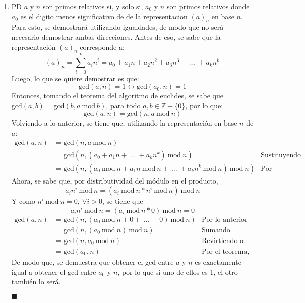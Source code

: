 \documentclass[letter]{article}
\begin{document}
\begin{pregunta}{1}
\begin{enumerate}
		\item \underline{PD} $a$ y $n$ son primos relativos si, y solo si, $a_0$ y $n$ son primos relativos donde $a_0$ es el digito menos significativo de de la representacion $(a)_n$ en base $n$.\\
		Para esto, se demostrará utilizando igualdades, de modo que no será necesario demostrar ambas direcciones. Antes de eso, se sabe que la representación $(a)_n$ corresponde a:
		$$(a)_n = \sum_{i=0}^{k} a_in^i = a_0 + a_1 n + a_2 n^2 + a_3 n^3 +\ ... \ + a_k n^k$$
		Luego, lo que se quiere demostrar es que:
		$$\text{gcd}(a,n) = 1 \leftrightarrow \text{gcd}(a_0, n) = 1$$
		Entonces, tomando el teorema del algoritmo de euclides, se sabe que $\text{gcd}(a,b)=\text{gcd}(b, a\ \text{mod} \ b)$, para todo $a, b \in \mathbb{Z} - \{0\}$, por lo que:
		$$\text{gcd}(a, n) = \text{gcd}(n, a\ \text{mod} \ n)$$
		Volviendo a lo anterior, se tiene que, utilizando la representación en base $n$ de $a$:
		\begin{align*}
			\text{gcd}(a, n) & = \text{gcd}(n, a\ \text{mod} \ n)& \\
			&= \text{gcd}(n, (a_0 + a_1 n +\ ... \ + a_k n^k)\ \text{mod} \ n) & \text{Sustituyendo}\\
			&= \text{gcd}(n, (a_0\ \text{mod} \ n + a_1 n\ \text{mod} \ n +\ ... \ + a_k n^k\ \text{mod} \ n)\ \text{mod} \ n) & \text{Por distributividad}
		\end{align*}
		Ahora, se sabe que, por distributividad del módulo en el producto, 
		$$a_in^i \ \text{mod} \ n = (a_i\ \text{mod} \ n * n^i \ \text{mod} \ n) \ \text{mod} \ n $$
		Y como $n^i \ \text{mod} \ n = 0, \  \forall i > 0$, se tiene que 
		$$a_in^i \ \text{mod} \ n = (a_i\ \text{mod} \ n * 0) \ \text{mod} \ n = 0$$
		\begin{align*}
			\text{gcd}(a, n)&= \text{gcd}(n, (a_0\ \text{mod} \ n + 0 +\ ... \ + 0)\ \text{mod} \ n) & \text{Por lo anterior}\\
			&= \text{gcd}(n, (a_0\ \text{mod} \ n)\ \text{mod} \ n) & \text{Sumando} \\
			&= \text{gcd}(n, a_0\ \text{mod} \ n) & \text{Revirtiendo o sacando el módulo}\\
			&= \text{gcd}(a_0, n) & \text{Por el teorema, al revés}
		\end{align*}
		De modo que, se demuestra que obtener el gcd entre $a$ y $n$ es exactamente igual a obtener el gcd entre $a_0$ y $n$, por lo que si uno de ellos es 1, el otro también lo será.
		\begin{flushright}$\blacksquare$\end{flushright}
		\end{enumerate}
	\end{pregunta}
\end{document}
